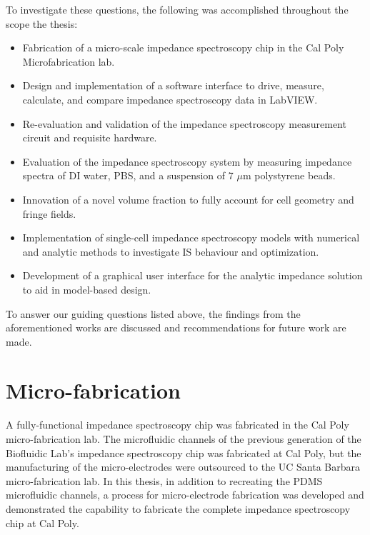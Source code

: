 \par To investigate these questions, the following was accomplished throughout the scope the thesis:
\begin{itemize}
    \item Fabrication of a micro-scale impedance spectroscopy chip in the Cal Poly Microfabrication lab.
    \item Design and implementation of a software interface to drive, measure, calculate, and compare impedance spectroscopy data in LabVIEW.
    \item Re-evaluation and validation of the impedance spectroscopy measurement circuit and requisite hardware.
    \item Evaluation of the impedance spectroscopy system by measuring impedance spectra of DI water, PBS, and a suspension of 7 $\mu$m polystyrene beads.
    \item Innovation of a novel volume fraction to fully account for cell geometry and fringe fields.
    \item Implementation of single-cell impedance spectroscopy models with numerical and analytic methods to investigate IS behaviour and optimization.
    \item Development of a graphical user interface for the analytic impedance solution to aid in model-based design.
\end{itemize}

\par To answer our guiding questions listed above, the findings from the aforementioned works are discussed and recommendations for future work are made.
    


\section{Micro-fabrication}

\par A fully-functional impedance spectroscopy chip was fabricated in the Cal Poly micro-fabrication lab. The microfluidic channels of the previous generation of the Biofluidic Lab's impedance spectroscopy chip was fabricated at Cal Poly, but the manufacturing of the micro-electrodes were outsourced to the UC Santa Barbara micro-fabrication lab. In this thesis, in addition to recreating the PDMS microfluidic channels, a process for micro-electrode fabrication was developed and demonstrated the capability to fabricate the complete impedance spectroscopy chip at Cal Poly.

